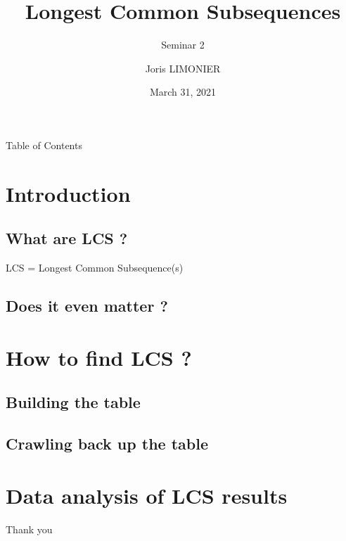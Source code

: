 \documentclass{beamer}
\title{Longest Common Subsequences}
\subtitle{Seminar 2}
\author{Joris LIMONIER}
\institute{University of Luxembourg}
\date{March 31, 2021}
\begin{document}
\maketitle

\begin{frame}{Table of Contents}
    \tableofcontents
\end{frame}


\section{Introduction}
\subsection{What are LCS ?}
\begin{frame}
    LCS = Longest Common Subsequence(s)
\end{frame}

\subsection{Does it even matter ?}
\begin{frame}
\end{frame}

\begin{frame}
\end{frame}

\begin{frame}
\end{frame}

\section{How to find LCS ?}
\subsection{Building the table}
\begin{frame}
\end{frame}

\subsection{Crawling back up the table}
\begin{frame}
\end{frame}

\section{Data analysis of LCS results}
\begin{frame}
\end{frame}

\begin{frame}[standout]
    Thank you
\end{frame}
\end{document}
